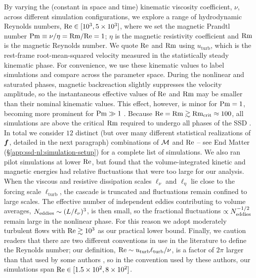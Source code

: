     By varying the (constant in space and time) kinematic viscosity coefficient, $\nu$, across different simulation configurations, we explore a range of hydrodynamic Reynolds numbers, $\mathrm{Re} \in [10^3, 5\times 10^3]$, where we set the magnetic Prandtl number $\mathrm{Pm} \equiv \nu/\eta = \mathrm{Rm}/\mathrm{Re} = 1$; $\eta$ is the magnetic resistivity coefficient and $\mathrm{Rm}$ is the magnetic Reynolds number. We quote $\mathrm{Re}$ and $\mathrm{Rm}$ using $u_\mathrm{turb}$, which is the rest-frame root-mean-squared velocity measured in the statistically steady kinematic phase. For convenience, we use these kinematic values to label simulations and compare across the parameter space. During the nonlinear and saturated phases, magnetic backreaction slightly suppresses the velocity amplitude, so the instantaneous effective values of $\mathrm{Re}$ and $\mathrm{Rm}$ may be smaller than their nominal kinematic values. This effect, however, is minor for $\mathrm{Pm} = 1$, becoming more prominent for $\mathrm{Pm} \gg 1$ \citep{seta2021saturation, shivakumar2025numerical}. Because $\mathrm{Re} = \mathrm{Rm} \gtrsim \mathrm{Rm}_\mathrm{crit} \approx 100$, all simulations are above the critical $\mathrm{Rm}$ required to undergo all phases of the SSD \citep{schekochihin2007fluctuation, schober2015saturation, Seta2020_critical_Rm}. In total we consider $12$ distinct (but over many different statistical realizations of $\bm{f}$, detailed in the next paragraph) combinations of $\mathcal{M}$ and $\mathrm{Re}$ -- see End Matter (\S\ref{app:ssd-nl:simulation-setup}) for a complete list of simulations. We also ran pilot simulations at lower $\mathrm{Re}$, but found that the volume-integrated kinetic and magnetic energies had relative fluctuations that were too large for our analysis. When the viscous and resistive dissipation scales $\ell_\nu$ and $\ell_\eta$ lie close to the forcing scale $\ell_\mathrm{turb}$, the cascade is truncated and fluctuations remain confined to large scales. The effective number of independent eddies contributing to volume averages, $N_{\rm eddies} \sim (L/\ell_\nu)^3$, is then small, so the fractional fluctuations $\propto N_{\rm eddies}^{-1/2}$ remain large in the nonlinear phase. For this reason we adopt moderately turbulent flows with $\mathrm{Re} \gtrsim 10^3$ as our practical lower bound. Finally, we caution readers that there are two different conventions in use in the literature to define the Reynolds number; our definition, $\mathrm{Re} \sim u_\mathrm{turb} \ell_\mathrm{turb} / \nu$, is a factor of $2\pi$ larger than that used by some authors \citep[\eg][]{brandenburg2023dissipative, galishnikova2022tearing}, so in the convention used by these authors, our simulations span $\mathrm{Re} \in [1.5\times 10^2, 8\times 10^2]$.

